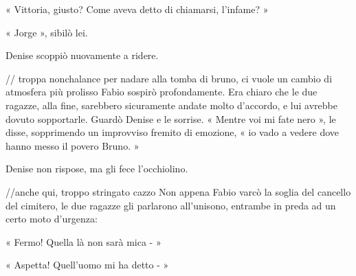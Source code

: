 « Vittoria, giusto? Come aveva detto di chiamarsi, l'infame? »

« Jorge », sibilò lei.

Denise scoppiò nuovamente a ridere.

// troppa nonchalance per nadare alla tomba di bruno, ci vuole un cambio di atmosfera più prolisso
Fabio sospirò profondamente. Era chiaro che le due ragazze, alla fine, sarebbero sicuramente andate molto d'accordo, e lui avrebbe dovuto sopportarle. Guardò Denise e le sorrise. « Mentre voi mi fate nero », le disse, sopprimendo un improvviso fremito di emozione, « io vado a vedere dove hanno messo il povero Bruno. »

Denise non rispose, ma gli fece l'occhiolino.

//anche qui, troppo stringato cazzo
Non appena Fabio varcò la soglia del cancello del cimitero, le due ragazze gli parlarono all'unisono, entrambe in preda ad un certo moto d'urgenza:

« Fermo! Quella là non sarà mica - »

« Aspetta! Quell'uomo mi ha detto - »
